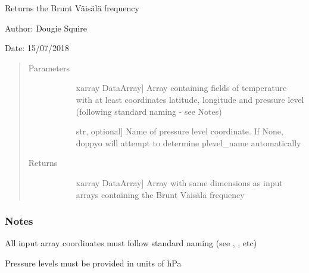 \documentclass[letterpaper,10pt,english]{sphinxmanual}
\begin{document}

\begin{fulllineitems}
\label{\detokenize{diagnostic_doc:diagnostic.Brunt_Vaisala}}
Returns the Brunt Väisälä frequency

\begin{DUlineblock}{0em}
\item[] Author: Dougie Squire
\item[] Date: 15/07/2018
\end{DUlineblock}
\begin{quote}\begin{description}
\item[{Parameters}] \leavevmode\begin{description}
\item[{}] \leavevmode{[}xarray DataArray{]}
Array containing fields of temperature with at least coordinates latitude, longitude and                     pressure level (following standard naming - see Notes)

\item[{}] \leavevmode{[}str, optional{]}
Name of pressure level coordinate. If None, doppyo will attempt to determine plevel\_name                     automatically

\end{description}

\item[{Returns}] \leavevmode\begin{description}
\item[{}] \leavevmode{[}xarray DataArray{]}
Array with same dimensions as input arrays containing the Brunt Väisälä frequency

\end{description}

\end{description}\end{quote}
\subsubsection*{Notes}

\begin{DUlineblock}{0em}
\item[] All input array coordinates must follow standard naming (see ,                 , etc)
\item[] Pressure levels must be provided in units of hPa
\end{DUlineblock}


\end{fulllineitems}
\end{document}
